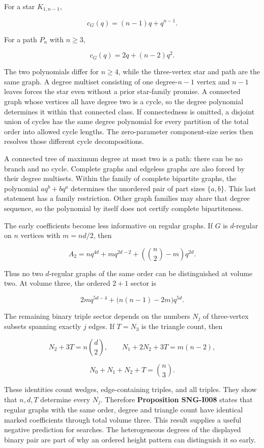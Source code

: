 \documentclass[
  11pt,
  a4paper,
]{report}
\begin{document}
For a star \(K_{1,n-1}\),

\[
c_G(q)=(n-1)q+q^{n-1}.
\]

For a path \(P_n\) with \(n\ge3\),

\[
c_G(q)=2q+(n-2)q^2.
\]

The two polynomials differ for \(n\ge4\), while the three-vertex star
and path are the same graph. A degree multiset consisting of one
degree-\(n-1\) vertex and \(n-1\) leaves forces the star even without a
prior star-family promise. A connected graph whose vertices all have
degree two is a cycle, so the degree polynomial determines it within
that connected class. If connectedness is omitted, a disjoint union of
cycles has the same degree polynomial for every partition of the total
order into allowed cycle lengths. The zero-parameter component-size
series then resolves those different cycle decompositions.

A connected tree of maximum degree at most two is a path: there can be
no branch and no cycle. Complete graphs and edgeless graphs are also
forced by their degree multisets. Within the family of complete
bipartite graphs, the polynomial \(a q^b+b q^a\) determines the
unordered pair of part sizes \(\{a,b\}\). This last statement has a
family restriction. Other graph families may share that degree sequence,
so the polynomial by itself does not certify complete bipartiteness.

The early coefficients become less informative on regular graphs. If
\(G\) is \(d\)-regular on \(n\) vertices with \(m=nd/2\), then

\[
A_2=nq^{4d}+m q^{2d-2}
+\left(\binom n2-m\right)q^{2d}.
\]

Thus no two \(d\)-regular graphs of the same order can be distinguished
at volume two. At volume three, the ordered \(2+1\) sector is

\[
2m q^{5d-4}+\bigl(n(n-1)-2m\bigr)q^{5d}.
\]

The remaining binary triple sector depends on the numbers \(N_j\) of
three-vertex subsets spanning exactly \(j\) edges. If \(T=N_3\) is the
triangle count, then

\[
N_2+3T=n\binom d2,
\qquad N_1+2N_2+3T=m(n-2),
\]

\[
N_0+N_1+N_2+T=\binom n3.
\]

These identities count wedges, edge-containing triples, and all triples.
They show that \(n,d,T\) determine every \(N_j\). Therefore
\textbf{Proposition SNG-I008} states that regular graphs with the same
order, degree and triangle count have identical marked coefficients
through total volume three. This result supplies a useful negative
prediction for searches. The heterogeneous degrees of the displayed
binary pair are part of why an ordered height pattern can distinguish it
so early.
\end{document}
